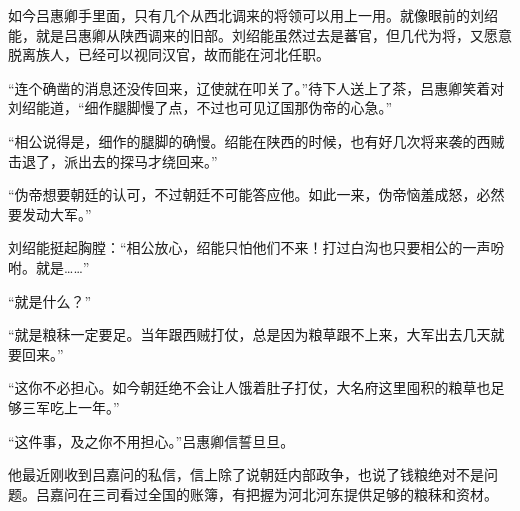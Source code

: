 如今吕惠卿手里面，只有几个从西北调来的将领可以用上一用。就像眼前的刘绍能，就是吕惠卿从陕西调来的旧部。刘绍能虽然过去是蕃官，但几代为将，又愿意脱离族人，已经可以视同汉官，故而能在河北任职。

“连个确凿的消息还没传回来，辽使就在叩关了。”待下人送上了茶，吕惠卿笑着对刘绍能道，“细作腿脚慢了点，不过也可见辽国那伪帝的心急。”

“相公说得是，细作的腿脚的确慢。绍能在陕西的时候，也有好几次将来袭的西贼击退了，派出去的探马才绕回来。”

“伪帝想要朝廷的认可，不过朝廷不可能答应他。如此一来，伪帝恼羞成怒，必然要发动大军。”

刘绍能挺起胸膛：“相公放心，绍能只怕他们不来！打过白沟也只要相公的一声吩咐。就是……”

“就是什么？”

“就是粮秣一定要足。当年跟西贼打仗，总是因为粮草跟不上来，大军出去几天就要回来。”

“这你不必担心。如今朝廷绝不会让人饿着肚子打仗，大名府这里囤积的粮草也足够三军吃上一年。”

“这件事，及之你不用担心。”吕惠卿信誓旦旦。

他最近刚收到吕嘉问的私信，信上除了说朝廷内部政争，也说了钱粮绝对不是问题。吕嘉问在三司看过全国的账簿，有把握为河北河东提供足够的粮秣和资材。
